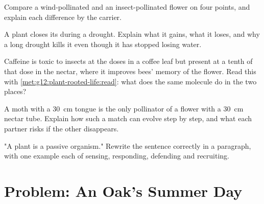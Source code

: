 \begin{exercise}[$\star\star$]\label{exo:g12:plant-rooted-life:11}
Compare a wind-pollinated and an insect-pollinated flower on four
points, and explain each difference by the carrier.
\end{exercise}

\begin{exercise}[$\star\star\star$]\label{exo:g12:plant-rooted-life:12}
A plant closes its  during a drought. Explain what it gains,
what it loses, and why a long drought kills it even though it has
stopped losing water.
\end{exercise}

\begin{exercise}[$\star\star\star$]\label{exo:g12:plant-rooted-life:13}
Caffeine is toxic to insects at the doses in a coffee leaf but present
at a tenth of that dose in the nectar, where it improves bees' memory
of the flower. Read this with \cref{met:g12:plant-rooted-life:read}:
what does the same molecule do in the two places?
\end{exercise}

\begin{exercise}[$\star\star\star$]\label{exo:g12:plant-rooted-life:14}
A moth with a \qty{30}{cm} tongue is the only pollinator of a flower
with a \qty{30}{cm} nectar tube. Explain how such a match can evolve
step by step, and what each partner risks if the other disappears.
\end{exercise}

\begin{exercise}[$\star\star\star$]\label{exo:g12:plant-rooted-life:15}
"A plant is a passive organism." Rewrite the sentence correctly in a
paragraph, with one example each of sensing, responding, defending
and recruiting.
\end{exercise}

\section{Problem: An Oak's Summer Day}

